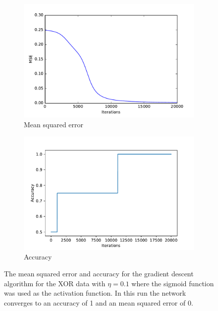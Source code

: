\documentclass[10 pt, a4paper]{article}
\begin{document}
\begin{figure}[H] 
\begin{subfigure}[b]{0.5\textwidth}
  \centering
    \includegraphics[width=\textwidth]{xor_mse}
  \caption{Mean squared error}
\end{subfigure}
\begin{subfigure}[b]{0.5\textwidth} 
  \centering
    \includegraphics[width=\textwidth]{xor_acc}
  \caption{Accuracy}
\end{subfigure}
\caption{The mean squared error and accuracy for the gradient descent algorithm for the XOR data with $\eta = 0.1$ where the sigmoid function was used as the activation function. In this run the network converges to an accuracy of 1 and an mean squared error of 0.}
  \label{fig:xormsenice}
\end{figure}
\end{document}
